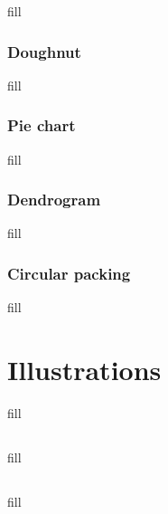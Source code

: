 \documentclass[
  b5paper]{book}
\begin{document}
fill

\hypertarget{doughnut}{%
\subsubsection*{Doughnut}\label{doughnut}}

fill

\hypertarget{pie-chart}{%
\subsubsection*{Pie chart}\label{pie-chart}}

fill

\hypertarget{dendrogram}{%
\subsubsection*{Dendrogram}\label{dendrogram}}

fill

\hypertarget{circular-packing}{%
\subsubsection*{Circular packing}\label{circular-packing}}

fill

\hypertarget{illustrations}{%
\section{Illustrations}\label{illustrations}}

fill

\hypertarget{section-1}{%
\subsection*{}\label{section-1}}

fill

\hypertarget{section-2}{%
\subsection*{}\label{section-2}}

fill

\hypertarget{section-3}{%
\subsection*{}\label{section-3}}
\end{document}
